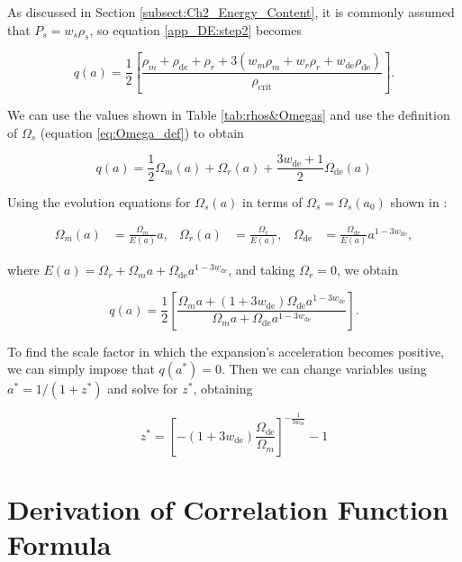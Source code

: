 \documentclass[openany,a4paper,12pt,oneside]{book}
\begin{document}
\begin{spacing}{1.5}
As discussed in Section \ref{subsect:Ch2_Energy_Content}, it is commonly assumed that $P_s=w_s\rho_s$, so equation \eqref{app_DE:step2} becomes

\begin{equation}\label{app_DE:step3}
	q(a)=\frac{1}{2}\left[\frac{\rho_m+\rho_\text{de}+\rho_r+3(w_m\rho_m+w_r\rho_r+w_\text{de}\rho_\text{de})}{\rho_\text{crit}}\right].
\end{equation}

We can use the values shown in Table \ref{tab:rhos&Omegas} and use the definition of $\Omega_s$ (equation \eqref{eq:Omega_def}) to obtain

\begin{equation}\label{q(a)_expression}
	q(a)=\frac{1}{2}\Omega_m(a)+\Omega_r(a)+\frac{3w_\text{de}+1}{2}\Omega_\text{de}(a)
\end{equation}

Using the evolution equations for $\Omega_s(a)$ in terms of $\Omega_s=\Omega_s(a_0)$ shown in \cite{dark_energy_era}:

\begin{align}\label{evolution_eqs}
	\Omega_m(a)&=\frac{\Omega_m}{E(a)}a, & \Omega_r(a)&=\frac{\Omega_r}{E(a)}, & \Omega_\text{de}&=\frac{\Omega_\text{de}}{E(a)}a^{1-3w_\text{de}},
\end{align}

\noindent where $E(a)=\Omega_r+\Omega_m a +\Omega_\text{de}a^{1-3w_\text{de}}$, and taking $\Omega_r=0$, we obtain

\begin{equation}\label{app_DE:step4}
	q(a)=\frac{1}{2}\left[\frac{\Omega_m a+(1+3w_\text{de})\Omega_\text{de}a^{1-3w_\text{de}}}{\Omega_m a +\Omega_\text{de}a^{1-3w_\text{de}}}\right].
\end{equation}

To find the scale factor in which the expansion's acceleration becomes positive, we can simply impose that $q(a^*)=0$. Then we can change variables using $a^*=1/(1+z^*)$ and solve for $z^*$, obtaining

\begin{equation}
	z^*=\left[-(1+3w_\text{de})\frac{\Omega_\text{de}}{\Omega_m}\right]^{-\frac{1}{3w_\text{de}}}-1
\end{equation}

\chapter{Derivation of Correlation Function Formula}\label{app:correlations_demo}


\end{spacing}
\end{document}
